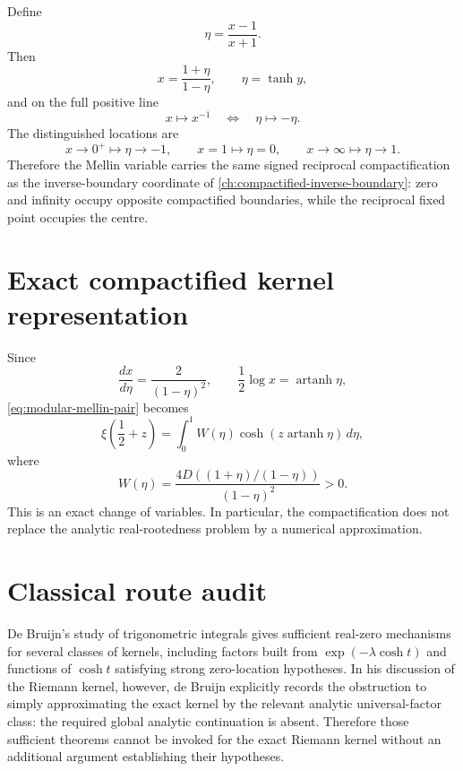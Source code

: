 Define
\begin{equation}
\boxed{
\eta=\frac{x-1}{x+1}.
}
\label{eq:kernel-eta}
\end{equation}
Then
\[
x=\frac{1+\eta}{1-\eta},
\qquad
\eta=\tanh y,
\]
and on the full positive line
\begin{equation}
\boxed{
x\mapsto x^{-1}
\quad\Longleftrightarrow\quad
\eta\mapsto-\eta.
}
\label{eq:kernel-inversion-eta}
\end{equation}
The distinguished locations are
\[
x\to0^+\mapsto\eta\to-1,
\qquad
x=1\mapsto\eta=0,
\qquad
x\to\infty\mapsto\eta\to1.
\]
Therefore the Mellin variable carries the same signed reciprocal compactification as the inverse-boundary coordinate of \cref{ch:compactified-inverse-boundary}: zero and infinity occupy opposite compactified boundaries, while the reciprocal fixed point occupies the centre.

\section{Exact compactified kernel representation}

Since
\[
\frac{dx}{d\eta}=\frac{2}{(1-\eta)^2},
\qquad
\frac12\log x=\operatorname{artanh}\eta,
\]
\cref{eq:modular-mellin-pair} becomes
\begin{equation}
\boxed{
\xi\!\left(\frac12+z\right)
=
\int_0^1 W(\eta)
\cosh\!\left(z\operatorname{artanh}\eta\right)\,d\eta,
}
\label{eq:compactified-riemann-kernel}
\end{equation}
where
\begin{equation}
\boxed{
W(\eta)
=
\frac{4D\!\left((1+\eta)/(1-\eta)\right)}{(1-\eta)^2}>0.
}
\label{eq:compactified-weight}
\end{equation}
This is an exact change of variables.  In particular, the compactification does not replace the analytic real-rootedness problem by a numerical approximation.

\section{Classical route audit}

De Bruijn's study of trigonometric integrals gives sufficient real-zero mechanisms for several classes of kernels, including factors built from $\exp(-\lambda\cosh t)$ and functions of $\cosh t$ satisfying strong zero-location hypotheses.  In his discussion of the Riemann kernel, however, de Bruijn explicitly records the obstruction to simply approximating the exact kernel by the relevant analytic universal-factor class: the required global analytic continuation is absent.  Therefore those sufficient theorems cannot be invoked for the exact Riemann kernel without an additional argument establishing their hypotheses.

